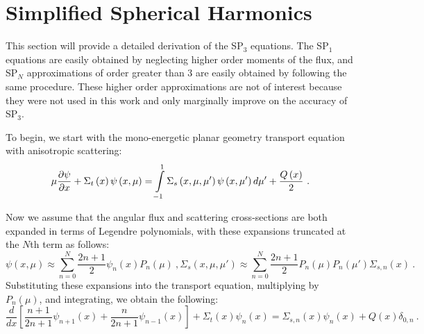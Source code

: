 \section{Simplified Spherical Harmonics}\label{appsec:SPn}

This section will provide a detailed derivation of the SP$_3$ equations.  The SP$_1$ equations are easily obtained by neglecting higher order moments of the flux, and SP$_N$ approximations of order greater than 3 are easily obtained by following the same procedure.  These higher order approximations are not of interest because they were not used in this work and only marginally improve on the accuracy of SP$_3$.

To begin, we start with the mono-energetic planar geometry transport equation with anisotropic scattering:
\begin{equation}
\mu\frac{\partial \psi}{\partial x} + \Sigma_{t}\left(x\right) \psi\left(x,\mu\right) = \intop_{-1}^1 \Sigma_{s}\left(x,\mu,\mu'\right) \psi\left(x,\mu'\right) d\mu' + \frac{Q\left(x\right)}{2}\ .
\end{equation}

Now we assume that the angular flux and scattering cross-sections are both expanded in terms of Legendre polynomials, with these expansions truncated at the $N$th term as follows:
\begin{subequations}
\begin{equation}
\psi\left(x,\mu\right) \approx \sum_{n=0}^N \frac{2n+1}{2} \psi_{n}\left(x\right) P_n\left(\mu\right)\ ,
\end{equation}
\begin{equation}
\Sigma_{s}\left(x,\mu,\mu'\right) \approx \sum_{n=0}^N \frac{2n+1}{2} P_n\left(\mu\right)P_n\left(\mu'\right)\Sigma_{s,n}\left(x\right)\ .
\end{equation}
\end{subequations}
Substituting these expansions into the transport equation, multiplying by $P_n\left(\mu\right)$, and integrating, we obtain the following:
\begin{equation}\label{e:SPnGeneral}
\frac{d}{dx}\left[\frac{n+1}{2n+1}\psi_{n+1}\left(x\right) + \frac{n}{2n+1}\psi_{n-1}\left(x\right)\right] + \Sigma_{t}\left(x\right) \psi_{n}\left(x\right) = \Sigma_{s,n}\left(x\right) \psi_n\left(x\right) + Q\left(x\right)\delta_{0,n}\ .
\end{equation}

